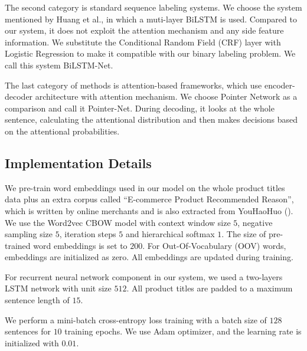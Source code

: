 The second category is standard sequence labeling systems. 
We choose the system mentioned by 
Huang et al.,
in which a muti-layer BiLSTM is used.
Compared to our system, it does not exploit the attention mechanism and 
any side feature information.
We substitute the Conditional Random Field (CRF) layer with 
Logistic Regression to make it compatible with our binary labeling problem.
We call this system BiLSTM-Net.

The last category of methods is attention-based frameworks, 
which use encoder-decoder architecture with attention mechanism.
We choose Pointer Network \cite{vinyals2015pointer} as a comparison and 
call it Pointer-Net.
During decoding, it looks at the whole sentence, calculating the attentional 
distribution and then makes decisions based on the attentional probabilities.
 

\subsection{Implementation Details}
We pre-train word embeddings used in our model 
on the whole product titles data plus an extra corpus called 
``E-commerce Product Recommended Reason'',
which is written by online merchants and is also extracted from YouHaoHuo
().
We use the Word2vec \cite{mikolov2013efficient,mikolov2013distributed} 
CBOW model with context window size $5$, negative sampling size $5$, 
iteration steps $5$ and hierarchical softmax $1$. 
The size of pre-trained word embeddings is set to $200$. 
For Out-Of-Vocabulary (OOV) words, embeddings are initialized as zero.
All embeddings are updated during training. 

For recurrent neural network component in our system, 
we used a two-layers LSTM network with unit size $512$.
All product titles are padded to a maximum sentence length of $15$.

We perform a mini-batch cross-entropy loss training with a batch size 
of $128$ sentences for $10$ training epochs.  We use Adam optimizer, 
and the learning rate is initialized with $0.01$.

